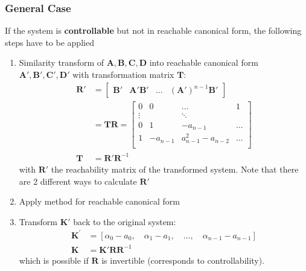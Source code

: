 \subsubsection{General Case}
If the system is \textbf{controllable} but not in reachable canonical form, the following steps have to be applied
\begin{enumerate}
    \item Similarity transform of $\mathbf{A,B,C,D}$ into reachable canonical form $\mathbf{A',B',C',D'}$ with transformation matrix $\mathbf{T}$:
          \noindent\begin{align*}
              \mathbf{R}' & =\begin{bmatrix}
                                 \mathbf{B}' & \mathbf{A}'\mathbf{B}' & \ldots & {(\mathbf{A}')}^{n-1}\mathbf{B}'
                             \end{bmatrix} \\
                          & =\mathbf{TR}  =\begin{bmatrix}
                                               0      & 0        & \dots               & 1     \\
                                               \vdots &          & \ddots              &       \\
                                               0      & 1        & -a_{n-1}            & \dots \\
                                               1      & -a_{n-1} & a_{n-1}^2 - a_{n-2} & \dots \\
                                           \end{bmatrix}                                \\
              \mathbf{T}  & = \mathbf{R'R}^{-1}
          \end{align*}
          with $\mathbf{R}'$ the reachability matrix of the transformed system. Note that there are 2 different ways to calculate $\mathbf{R}'$
    \item Apply method for reachable canonical form
    \item Transform $\mathbf{K}'$ back to the original system:
          \noindent\begin{align*}
              \mathbf{K}^{\prime} & =\left[\alpha_{0}-a_{0},\quad\alpha_{1}-a_{1},\quad\ldots,\quad\alpha_{n-1}-a_{n-1}\right] \\
              \mathbf{K}          & = \mathbf{K'RR}^{-1}
          \end{align*}
          which is possible if $\mathbf{R}$ is invertible (corresponds to controllability).
\end{enumerate}

